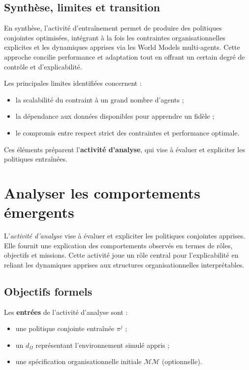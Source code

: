 \section{Synthèse, limites et transition}

En synthèse, l’activité d’entraînement permet de produire des politiques conjointes optimisées, intégrant à la fois les contraintes organisationnelles explicites et les dynamiques apprises via les World Models multi-agents.
Cette approche concilie performance et adaptation tout en offrant un certain degré de contrôle et d’explicabilité.

Les principales limites identifiées concernent :
\begin{itemize}
    \item la scalabilité du  contraint à un grand nombre d’agents ;
    \item la dépendance aux données disponibles pour apprendre un  fidèle ;
    \item le compromis entre respect strict des contraintes et performance optimale.
\end{itemize}

Ces éléments préparent l’\textbf{activité d’analyse}, qui vise à évaluer et expliciter les politiques entraînées.


\clearpage
\thispagestyle{empty}
\null
\newpage

\chapter{Analyser les comportements émergents}
\label{chap:analyzing}

L'\textit{activité d’analyse} vise à évaluer et expliciter les politiques conjointes apprises. Elle fournit une explication des comportements observés en termes de rôles, objectifs et missions. Cette activité joue un rôle central pour l’explicabilité en reliant les dynamiques apprises aux structures organisationnelles interprétables.


\section*{Objectifs formels}


Les \textbf{entrées} de l’activité d’analyse sont :
\begin{itemize}
    \item une politique conjointe entraînée $\pi^j$ ;
    \item un  $d_\Omega$ représentant l’environnement simulé appris ;
    \item une spécification organisationnelle initiale $\mathcal{MM}$ (optionnelle).
\end{itemize}

